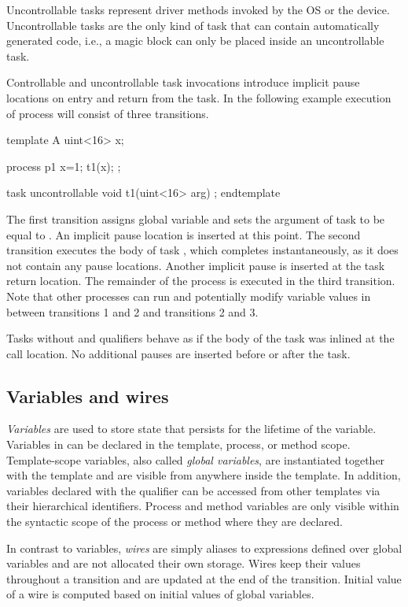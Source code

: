 Uncontrollable tasks represent driver methods invoked by the OS or 
the device.  Uncontrollable tasks are the only kind of task that 
can contain automatically generated code, i.e., a magic block can 
only be placed inside an uncontrollable task.  

Controllable and uncontrollable task invocations introduce 
implicit pause locations on entry and return from the task.  In 
the following example execution of process  will consist 
of three transitions.
\begin{tsllisting2}
template A
  uint<16> x;

  process p1 {
    x=1;
    t1(x);
  };

  task uncontrollable void t1(uint<16> arg) {};
endtemplate
\end{tsllisting2}
The first transition assigns global variable  and sets the 
argument of task  to be equal to .   An implicit 
pause location is inserted at this point.  The second transition 
executes the body of task , which completes 
instantaneously, as it does not contain any pause locations.  
Another implicit pause is inserted at the task return location.  
The remainder of the process is executed in the third transition.  
Note that other processes can run and potentially modify variable 
values in between transitions 1 and 2 and transitions 2 and 3.

Tasks without  and  
qualifiers behave as if the body of the task was inlined at the 
call location.  No additional pauses are inserted before or after 
the task.

\subsection{Variables and wires}\label{s:o:variables}

\emph{Variables} are used to store state that persists for the 
lifetime of the variable.  Variables in \tsl can be declared in 
the template, process, or method scope.  Template-scope variables, 
also called \emph{global variables}, are instantiated together 
with the template and are visible from anywhere inside the 
template.  In addition, variables declared with the  
qualifier can be accessed from other templates via their 
hierarchical identifiers.  Process and method variables are only 
visible within the syntactic scope of the process or method where 
they are declared.

In contrast to variables, \emph{wires} are simply aliases to 
expressions defined over global variables and are not allocated 
their own storage.  Wires keep their values throughout a 
transition and are updated at the end of the transition.  Initial 
value of a wire is computed based on initial values of global 
variables.

